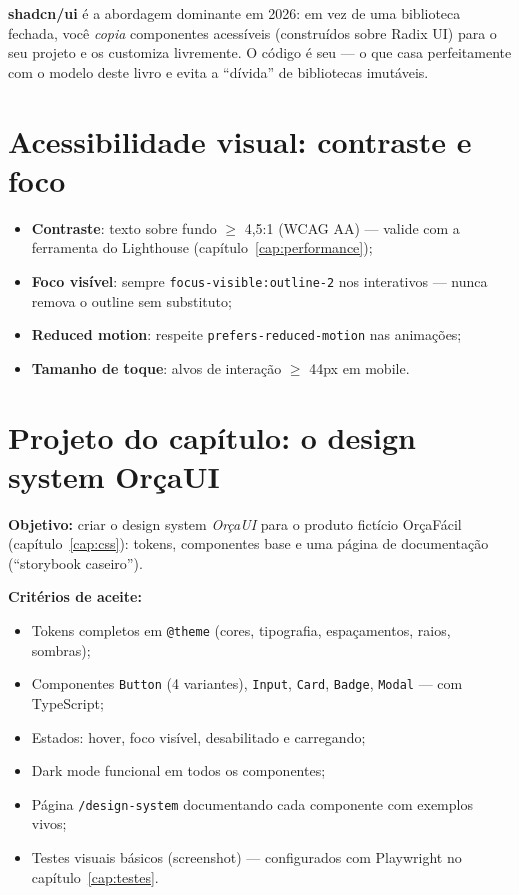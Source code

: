 \begin{caixaconceito}
\textbf{shadcn/ui} é a abordagem dominante em 2026: em vez de uma biblioteca
fechada, você \emph{copia} componentes acessíveis (construídos sobre Radix
UI) para o seu projeto e os customiza livremente. O código é seu — o que casa
perfeitamente com o modelo deste livro e evita a ``dívida'' de bibliotecas
imutáveis.
\end{caixaconceito}

\section{Acessibilidade visual: contraste e foco}

\begin{itemize}[leftmargin=*, itemsep=0.4em]
  \item \textbf{Contraste}: texto sobre fundo $\geq$ 4,5:1 (WCAG AA) — valide
  com a ferramenta do Lighthouse (capítulo~\ref{cap:performance});
  \item \textbf{Foco visível}: sempre \texttt{focus-visible:outline-2} nos
  interativos — nunca remova o outline sem substituto;
  \item \textbf{Reduced motion}: respeite \texttt{prefers-reduced-motion} nas
  animações;
  \item \textbf{Tamanho de toque}: alvos de interação $\geq$ 44px em mobile.
\end{itemize}

\section{Projeto do capítulo: o design system OrçaUI}
\label{sec:projeto9}

\begin{caixaprojeto}
\textbf{Objetivo:} criar o design system \emph{OrçaUI} para o produto fictício
OrçaFácil (capítulo~\ref{cap:css}): tokens, componentes base e uma página de
documentação (``storybook caseiro'').

\textbf{Critérios de aceite:}
\begin{itemize}[leftmargin=*, itemsep=0.2em]
  \item Tokens completos em \texttt{@theme} (cores, tipografia, espaçamentos, raios, sombras);
  \item Componentes \texttt{Button} (4 variantes), \texttt{Input}, \texttt{Card}, \texttt{Badge}, \texttt{Modal} — com TypeScript;
  \item Estados: hover, foco visível, desabilitado e carregando;
  \item Dark mode funcional em todos os componentes;
  \item Página \texttt{/design-system} documentando cada componente com exemplos vivos;
  \item Testes visuais básicos (screenshot) — configurados com Playwright no capítulo~\ref{cap:testes}.
\end{itemize}
\end{caixaprojeto}

